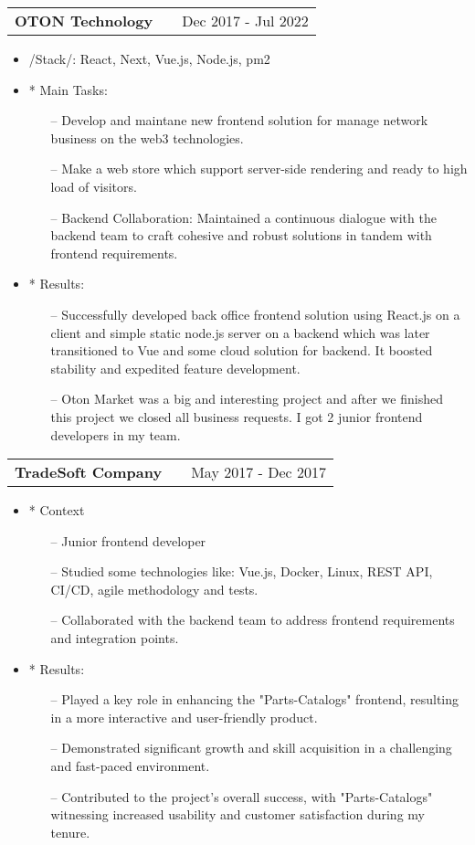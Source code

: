 \documentclass[a4paper,12pt]{article}
\makeatletter
\newenvironment{joblong}[2]
    {
    \begin{tabularx}{\linewidth}{@{}l X r@{}}
    \textbf{#1} & \hfill &  #2 \\[3.75pt]
    \end{tabularx}
    \begin{minipage}[t]{\linewidth}
    \begin{itemize}[nosep,after=\strut, leftmargin=1em, itemsep=3pt,label=--]
    }
    {
    \end{itemize}
    \end{minipage}    
    }
\makeatother
\begin{document}
\begin{joblong}{OTON Technology}{Dec 2017 - Jul 2022}
  \item /Stack/: {React, Next, Vue.js, Node.js, pm2}
  \item [*] Main Tasks:
    \begin{itemize}
      \item [--] Develop and maintane new frontend solution for manage network  business on the web3 technologies.
      \item [--] Make a web store which support server-side rendering and ready to high load of visitors.
      \item [--] Backend Collaboration: Maintained a continuous dialogue with the backend team to craft cohesive and robust solutions in tandem with frontend requirements.
    \end{itemize}

  \item [*] Results:
      \begin{itemize}
      \item [--] Successfully developed back office frontend solution using React.js on a client and simple static node.js server on a backend which was later transitioned to Vue and some cloud solution for backend. It boosted stability and  expedited feature development.
      \item [--] Oton Market was a big and interesting project and after we finished this project we closed all business requests. I got 2 junior frontend developers in my team. 
        \end{itemize}
\end{joblong}

\begin{joblong}{TradeSoft Company}{May 2017 - Dec 2017}
  \item[*] Context
    \begin{itemize}
      \item [--] Junior frontend developer
      \item [--] Studied some technologies like: Vue.js, Docker, Linux, REST API, CI/CD, agile methodology and tests.
      \item [--] Collaborated with the backend team to address frontend requirements and integration points.
    \end{itemize}
  
  \item [*] Results:
    \begin{itemize}
      \item [--] Played a key role in enhancing the "Parts-Catalogs" frontend, resulting in a more interactive and user-friendly product.
      \item [--] Demonstrated significant growth and skill acquisition in a challenging and fast-paced environment.
      \item [--] Contributed to the project's overall success, with "Parts-Catalogs" witnessing increased usability and customer satisfaction during my tenure.
    \end{itemize}
\end{joblong}
  
\end{document}
